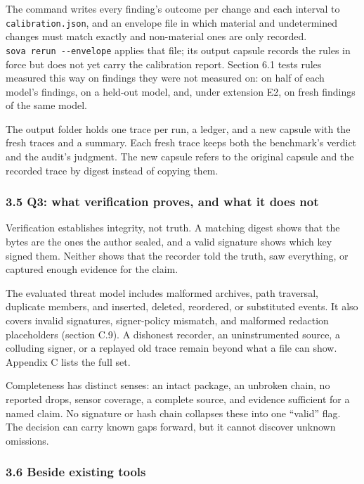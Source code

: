 \documentclass[
  american,
  10pt,
  a4paper,
]{article}
\begin{document}
The command writes every finding's outcome per change and each interval
to \texttt{calibration.json}, and an envelope file in which material and
undetermined changes must match exactly and non-material ones are only
recorded. \texttt{sova\ rerun\ -\/-envelope} applies that file; its
output capsule records the rules in force but does not yet carry the
calibration report. Section 6.1 tests rules measured this way on
findings they were not measured on: on half of each model's findings, on
a held-out model, and, under extension E2, on fresh findings of the same
model.

The output folder holds one trace per run, a ledger, and a new capsule
with the fresh traces and a summary. Each fresh trace keeps both the
benchmark's verdict and the audit's judgment. The new capsule refers to
the original capsule and the recorded trace by digest instead of copying
them.

\subsubsection{3.5 Q3: what verification proves, and what it does
not}\label{q3-what-verification-proves-and-what-it-does-not}

Verification establishes integrity, not truth. A matching digest shows
that the bytes are the ones the author sealed, and a valid signature
shows which key signed them. Neither shows that the recorder told the
truth, saw everything, or captured enough evidence for the claim.

The evaluated threat model includes malformed archives, path traversal,
duplicate members, and inserted, deleted, reordered, or substituted
events. It also covers invalid signatures, signer-policy mismatch, and
malformed redaction placeholders (section C.9). A dishonest recorder, an
uninstrumented source, a colluding signer, or a replayed old trace
remain beyond what a file can show. Appendix C lists the full set.

Completeness has distinct senses: an intact package, an unbroken chain,
no reported drops, sensor coverage, a complete source, and evidence
sufficient for a named claim. No signature or hash chain collapses these
into one ``valid'' flag. The decision can carry known gaps forward, but
it cannot discover unknown omissions.

\subsubsection{3.6 Beside existing tools}\label{beside-existing-tools}
\end{document}
